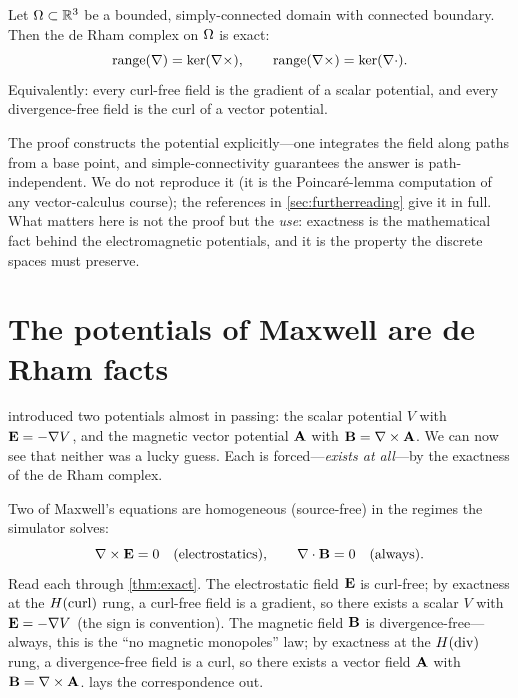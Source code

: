 \begin{theorem}\label{thm:exact}
Let $\Omega\subset\mathbb{R}^3$ be a bounded, simply-connected domain with connected
boundary. Then the de Rham complex on $\Omega$ is exact:
\[
  \operatorname{range}(\nabla)=\ker(\nabla\times), \qquad
  \operatorname{range}(\nabla\times)=\ker(\nabla\cdot).
\]
Equivalently: every curl-free field is the gradient of a scalar potential, and every
divergence-free field is the curl of a vector potential.
\end{theorem}

The proof constructs the potential explicitly---one integrates the field along paths
from a base point, and simple-connectivity guarantees the answer is
path-independent. We do not reproduce it (it is the Poincar\'e-lemma computation of
any vector-calculus course); the references in \cref{sec:furtherreading} give it in
full. What matters here is not the proof but the \emph{use}: exactness is the
mathematical fact behind the electromagnetic potentials, and it is the property the
discrete spaces must preserve.

\section{The potentials of Maxwell are de Rham facts}
\label{sec:potentials}

 introduced two potentials almost in passing: the scalar potential
$V$ with $\mathbf{E}=-\nabla V$, and the magnetic vector potential $\mathbf{A}$ with $\mathbf{B}=\nabla\times\mathbf{A}$.
We can now see that neither was a lucky guess. Each is forced---\emph{exists at
all}---by the exactness of the de Rham complex.

Two of Maxwell's equations are homogeneous (source-free) in the regimes the
simulator solves:
\[
  \nabla\times\mathbf{E} = 0 \quad\text{(electrostatics)}, \qquad
  \nabla\cdot\mathbf{B} = 0 \quad\text{(always).}
\]
Read each through \cref{thm:exact}. The electrostatic field $\mathbf{E}$ is curl-free; by
exactness at the $H(\mathrm{curl})$ rung, a curl-free field is a gradient, so there exists a
scalar $V$ with $\mathbf{E}=-\nabla V$ (the sign is convention). The magnetic field $\mathbf{B}$ is
divergence-free---always, this is the ``no magnetic monopoles'' law; by exactness at
the $H(\mathrm{div})$ rung, a divergence-free field is a curl, so there exists a vector field
$\mathbf{A}$ with $\mathbf{B}=\nabla\times\mathbf{A}$.  lays the correspondence out.


